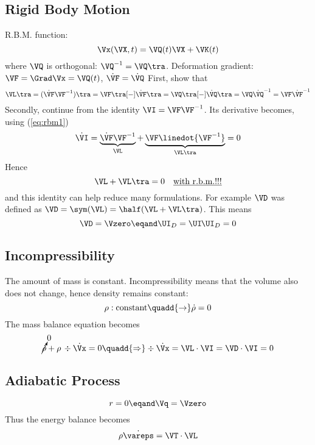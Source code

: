 \documentclass[a5paper,twosided,11pt,DIV=15,BCOR=0mm]{scrbook}
\newcommand{\veps}{\vareps}
\newcommand{\rtwo}{\UI\hspace{-0.07em}\UI}
\begin{document}
\subsection{Rigid Body Motion}
R.B.M. function:
\begin{equation}
  \Vx(\VX,t)=\VQ(t)\VX + \VK(t) \label{eq:rbm0}
\end{equation}
where $\VQ$ is orthogonal: $\VQ^{-1}=\VQ\tra$.
%
Deformation gradient: $\VF=\Grad\Vx=\VQ(t)$, $\dot{\VF}=\dot{\VQ}$
%
First, show that
\begin{equation}
  \VL\tra=(\dot{\VF}\VF^{-1})\tra=\VF\tra[-]\dot{\VF}\tra=\VQ\tra[-]\dot{\VQ}\tra
  =\VQ\dot{\VQ}^{-1}=\VF\dot{\VF}^{-1}\label{eq:rbm1}
\end{equation}
%
Secondly, continue from the identity $\VI=\VF\VF^{-1}$.
Its derivative becomes, using (\ref{eq:rbm1})
\begin{equation}
  \dot{\VI} = \underbrace{\dot{\VF}\VF^{-1}}_\text{$\VL$}
  + \underbrace{\VF\linedot{\VF^{-1}}}_\text{$\VL\tra$} = 0 \label{eq:rbm2}
\end{equation}
%
Hence
\begin{equation}
  \VL + \VL\tra = 0\quad\textup{\underline{with r.b.m.!!!}} \label{eq:rbm3}
\end{equation}
and this identity can help reduce many formulations. For example
$\VD$ was defined as $\VD=\sym(\VL)=\half(\VL+\VL\tra)$. This means
%
\begin{equation}
\VD=\Vzero \eqand \UI_D=\rtwo_D=0 \label{eq:rbm4}
\end{equation}
%
\subsection{Incompressibility}
%
The amount of mass is constant. Incompressibility means that the volume also
does not change, hence density remains constant:
\begin{equation}
  \rho:\textup{constant} \quadd{\rightarrow} \dot{\rho}=0
\end{equation}
%
The mass balance equation becomes
\begin{equation}
\cancelto{0}{\dot{\rho}}+\rho\,\div\dot{\Vx}= 0 \quadd{\Rightarrow}
\div\dot{\Vx} = \VL\cdot\VI = \VD\cdot\VI = 0
\end{equation}
%
\subsection{Adiabatic Process}
\begin{equation}
  r=0 \eqand \Vq=\Vzero
\end{equation}
Thus the energy balance becomes
%
\begin{equation}
  \rho\dot{\veps} = \VT\cdot\VL
\end{equation}
%
\end{document}
